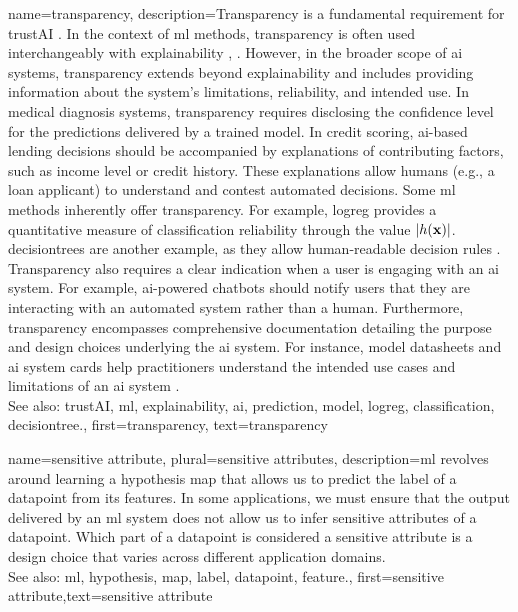 {name={transparency},
	description={Transparency is a fundamental requirement for 
		\gls{trustAI} \cite{HLEGTrustworhtyAI}. In the context of \gls{ml} 
		methods, transparency is often used interchangeably with \gls{explainability} 
		\cite{JunXML2020}, \cite{gallese2023ai}. However, in the broader scope of \gls{ai} 
		systems, transparency extends beyond \gls{explainability} and includes providing information 
		about the system’s limitations, reliability, and intended use. 
		In medical diagnosis systems, transparency requires disclosing the confidence level 
		for the \glspl{prediction} delivered by a trained \gls{model}. In credit scoring, 
		\gls{ai}-based lending decisions should be accompanied by explanations of 
		contributing factors, such as income level or credit history. These explanations 
		allow humans (e.g., a loan applicant) to understand and contest automated decisions. 
		Some \gls{ml} methods inherently offer transparency. For example, \gls{logreg} 
		provides a quantitative measure of \gls{classification} reliability through the value $|h({\bf x})|$. 
		\Glspl{decisiontree} are another example, as they allow human-readable decision rules \cite{rudin2019stop}.
		Transparency also requires a clear indication when a user is engaging with an \gls{ai} system. 
		For example, \gls{ai}-powered chatbots should notify users that they are interacting with an 
		automated system rather than a human. Furthermore, transparency encompasses comprehensive 
		documentation detailing the purpose and design choices underlying the \gls{ai} system. 
		For instance, \gls{model} datasheets \cite{DatasheetData2021} and \gls{ai} system cards \cite{10.1145/3287560.3287596} 
		help practitioners understand the intended use cases and limitations of an \gls{ai} system \cite{Shahriari2017}.
					\\ 
		See also: \gls{trustAI}, \gls{ml}, \gls{explainability}, \gls{ai}, \gls{prediction}, \gls{model}, \gls{logreg}, \gls{classification}, \gls{decisiontree}.},
	first={transparency}, text={transparency} 
}



{name={sensitive attribute}, plural={sensitive attributes},
	description={\gls{ml} revolves around learning a \gls{hypothesis} \gls{map} that allows 
		us to predict the \gls{label} of a \gls{datapoint} from its \glspl{feature}. In some 
		applications, we must ensure that the output delivered by an \gls{ml} system does 
		not allow us to infer sensitive attributes of a \gls{datapoint}. Which part 
		of a \gls{datapoint} is considered a sensitive attribute is a design 
		choice that varies across different application domains.
					\\ 
		See also: \gls{ml}, \gls{hypothesis}, \gls{map}, \gls{label}, \gls{datapoint}, \gls{feature}.},
	first={sensitive attribute},text={sensitive attribute} 
}


